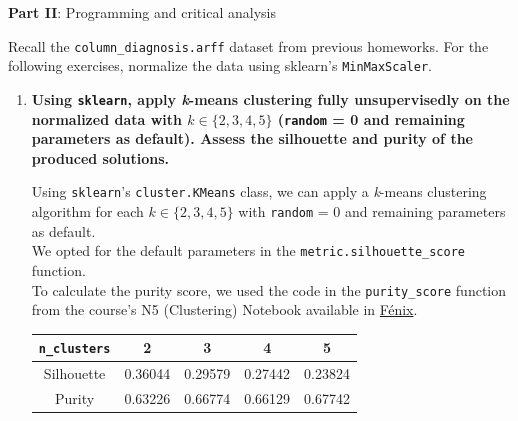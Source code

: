 \documentclass[12pt]{article}
\begin{document}
\vskip 0.5cm

\begin{center}
\large{\textbf{Part II}: Programming and critical analysis}\normalsize
\end{center}

\noindent Recall the \texttt{column\_diagnosis.arff} dataset from previous homeworks. For the following exercises,
normalize the data using sklearn's \texttt{MinMaxScaler}.

\begin{enumerate}[leftmargin=\labelsep]
    \item \textbf{Using \texttt{sklearn}, apply \textit{k}-means clustering fully unsupervisedly on the normalized data with
          $k \in \{2,3,4,5\}$ (\textnormal{\texttt{random} = 0} and remaining parameters as default).
          Assess the silhouette and purity of the produced solutions.}

          \vskip 0.3cm
          Using \texttt{sklearn}'s \texttt{cluster.KMeans} class, we can apply a \textit{k}-means clustering algorithm
          for each $k \in \{2,3,4,5\}$ with \texttt{random} = 0 and remaining parameters as default. \\
          We opted for the default parameters in the \texttt{metric.silhouette\_score} function. \\
          To calculate the purity score, we used the code in the \texttt{purity\_score} function from the
          course's N5 (Clustering) Notebook available in
          \href{https://fenix.tecnico.ulisboa.pt/disciplinas/Apre2/2023-2024/1-semestre/notebooks}{Fénix}.

          

          \begin{center}
              \captionsetup{type=table}
              \begin{tabular}{c|cccc}
                  \texttt{n\_clusters} & 2 & 3 & 4 & 5 \\
                  \hline
                  Silhouette           & 0.36044 & 0.29579 & 0.27442 & 0.23824 \\
                  Purity               & 0.63226 & 0.66774 & 0.66129 & 0.67742
              \end{tabular}
              \label{exII1-silhouette-purity}
          \end{center}


\end{enumerate}
\end{document}
